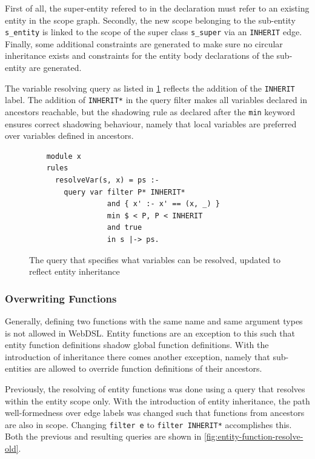      First of all, the super-entity refered to in the declaration must refer to an existing entity in the scope graph. Secondly, the new scope belonging to the sub-entity \texttt{s\_entity} is linked to the scope of the super class \texttt{s\_super} via an \texttt{INHERIT} edge. Finally, some additional constraints are generated to make sure no circular inheritance exists and constraints for the entity body declarations of the sub-entity are generated.

      The variable resolving query as listed in \cref{fig:var-resolve-query-inheritance} reflects the addition of the \texttt{INHERIT} label. The addition of \texttt{INHERIT*} in the query filter makes all variables declared in ancestors reachable, but the shadowing rule as declared after the \texttt{min} keyword ensures correct shadowing behaviour, namely that local variables are preferred over variables defined in ancestors.

      \begin{figure}
        \begin{verbatim}
    module x
    rules
      resolveVar(s, x) = ps :-
        query var filter P* INHERIT*
                  and { x' :- x' == (x, _) }
                  min $ < P, P < INHERIT
                  and true
                  in s |-> ps.
        \end{verbatim}
        \caption{\label{fig:var-resolve-query-inheritance}The query that specifies what variables can be resolved, updated to reflect entity inheritance}
      \end{figure}

    \subsubsection{Overwriting Functions}

      Generally, defining two functions with the same name and same argument types is not allowed in WebDSL. Entity functions are an exception to this such that entity function definitions shadow global function definitions. With the introduction of inheritance there comes another exception, namely that sub-entities are allowed to override function definitions of their ancestors.

      Previously, the resolving of entity functions was done using a query that resolves within the entity scope only. With the introduction of entity inheritance, the path well-formedness over edge labels was changed such that functions from ancestors are also in scope. Changing \texttt{filter e} to \texttt{filter INHERIT*} accomplishes this. Both the previous and resulting queries are shown in \cref{fig:entity-function-resolve-old}.

